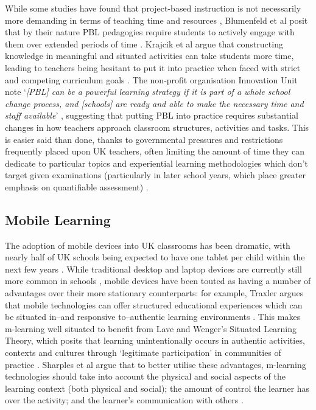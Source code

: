 \documentclass[,hyphens]{sigchi}
\begin{document}
While some studies have found that project-based instruction is not necessarily more demanding in terms of teaching time and resources \cite{Al-Balushi2014}, Blumenfeld et al posit that by their nature PBL pedagogies require students to actively engage with them over extended periods of time \cite{Blumenfeld1991}. Krajcik et al argue that constructing knowledge in meaningful and situated activities can take students more time, leading to teachers being hesitant to put it into practice when faced with strict and competing curriculum goals \cite{Krajcik2006}. The non-profit organisation Innovation Unit note `\textit{[PBL] can be a powerful learning strategy if it is part of a whole school change process, and [schools] are ready and able to make the necessary time and staff available}' \cite{InnovationUnit2016}, suggesting that putting PBL into practice requires substantial changes in how teachers approach classroom structures, activities and tasks. This is easier said than done, thanks to governmental pressures and restrictions frequently placed upon UK teachers, often limiting the amount of time they can dedicate to particular topics and experiential learning methodologies which don't target given examinations (particularly in later school years, which place greater emphasis on quantifiable assessment) \cite{Ofsted2018}.

\subsection{Mobile Learning}
The adoption of mobile devices into UK classrooms has been dramatic, with nearly half of UK schools being expected to have one tablet per child within the next few years \cite{BritishEducationalSuppliersAssociation2015}. While traditional desktop and laptop devices are currently still more common in schools \cite{BritishEducationalSuppliersAssociation2017}, mobile devices have been touted as having a number of advantages over their more stationary counterparts: for example, Traxler argues that mobile technologies can offer structured educational experiences which can be situated in--and responsive to--authentic learning environments \cite{Traxler2011}. This makes m-learning well situated to benefit from Lave and Wenger's Situated Learning Theory, which posits that learning unintentionally occurs in authentic activities, contexts and cultures through `legitimate participation' in communities of practice \cite{Lave1991}. Sharples et al argue that to better utilise these advantages, m-learning technologies should take into account the physical and social aspects of the learning context (both physical and social); the amount of control the learner has over the activity; and the learner's communication with others \cite{Sharples2007}.
\end{document}

